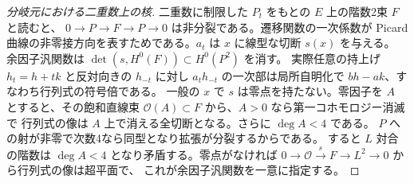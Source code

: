 \begin{proof}[分岐元における二重数上の核]
二重数に制限した $P_t$ をもとの $E$ 上の階数2束 $F$ と読むと、
$0\to P\to F\to P\to0$ は非分裂である。遷移関数の一次係数が
Picard曲線の非零接方向を表すためである。$a_t$ は $x$ に線型な切断 $s(x)$ を与える。
余因子汎関数は $\det(s,H^0(F))\subset H^0(P^2)$ を消す。
実際任意の持上げ $h_t=h+tk$ と反対向きの $h_{-t}$ に対し
$a_t h_{-t}$ の一次部は局所自明化で $bh-ak$、すなわち行列式の符号倍である。
一般の $x$ で $s$ は零点を持たない。零因子を $A$ とすると、その飽和直線束
$\mathcal O(A)\subset F$ から、$A>0$ なら第一コホモロジー消滅で
行列式の像は $A$ 上で消える全切断となる。さらに $\deg A<4$ である。
$P$ への射が非零で次数4なら同型となり拡張が分裂するからである。
すると $L$ 対合の階数は $\deg A<4$ となり矛盾する。零点がなければ
$0\to\mathcal O\xrightarrow{s}F\to L^2\to0$ から行列式の像は超平面で、
これが余因子汎関数を一意に指定する。
\end{proof}


